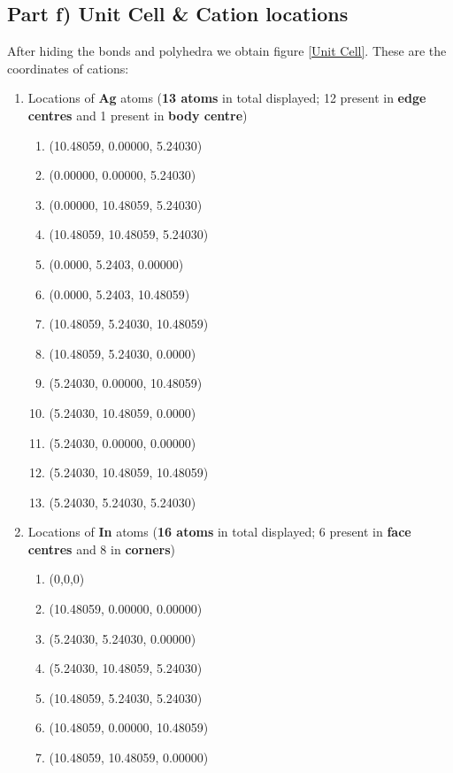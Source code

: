 \documentclass{homework}
\begin{document}
\subsection*{Part f) Unit Cell \& Cation locations}
After hiding the bonds and polyhedra we obtain figure \ref{Unit Cell}. These are the coordinates of cations:
\begin{enumerate}
    \item Locations of \textbf{Ag} atoms (\textbf{13 atoms} in total displayed; 12 present in \textbf{edge centres} and 1 present in \textbf{body centre})
    \begin{enumerate}
        \item (10.48059,  0.00000,   5.24030)
        \item (0.00000,   0.00000,  5.24030)
        \item (0.00000,   10.48059, 5.24030)
        \item (10.48059,  10.48059, 5.24030)
        \item (0.0000,    5.2403,   0.00000)
        \item (0.0000,    5.2403,   10.48059)
        \item (10.48059,  5.24030,  10.48059)
        \item (10.48059,  5.24030,  0.0000)
        \item (5.24030,   0.00000,  10.48059)
        \item (5.24030,   10.48059, 0.0000)
        \item (5.24030,   0.00000,  0.00000)
        \item (5.24030,   10.48059, 10.48059)
        \item (5.24030,   5.24030,   5.24030)
    \end{enumerate}
    \item Locations of \textbf{In} atoms (\textbf{16 atoms} in total displayed; 6 present in \textbf{face centres} and 8 in \textbf{corners})
    \begin{enumerate}
        \item (0,0,0)
        \item (10.48059,  0.00000,   0.00000)
        \item (5.24030,   5.24030,   0.00000)
        \item (5.24030,  10.48059,   5.24030)
        \item (10.48059,   5.24030,   5.24030)
        \item (10.48059,   0.00000,  10.48059)
        \item (10.48059,  10.48059,   0.00000)

\end{enumerate}
\end{enumerate}
\end{document}

